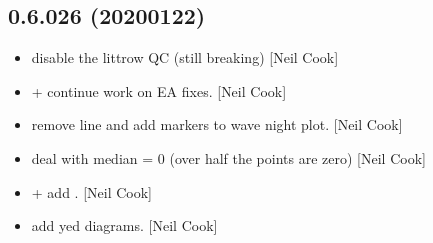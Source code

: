 \documentclass[a4paper,10pt,english]{report}
\begin{document}
\subsection{0.6.026 (2020\sphinxhyphen{}01\sphinxhyphen{}22)}
\label{\detokenize{misc/changelog:id12}}\begin{itemize}
\item {} 
 \sphinxhyphen{} disable the littrow QC (still breaking) {[}Neil
Cook{]}

\item {} 
 +  \sphinxhyphen{}
continue work on EA fixes. {[}Neil Cook{]}

\item {} 
 \sphinxhyphen{} remove line and add markers to wave night
plot. {[}Neil Cook{]}

\item {} 
 \sphinxhyphen{} deal with median = 0 (over half the points are
zero) {[}Neil Cook{]}

\item {} 
 +
 \sphinxhyphen{} add
. {[}Neil Cook{]}

\item {} 
 \sphinxhyphen{} add yed diagrams. {[}Neil Cook{]}

\end{itemize}
\end{document}

